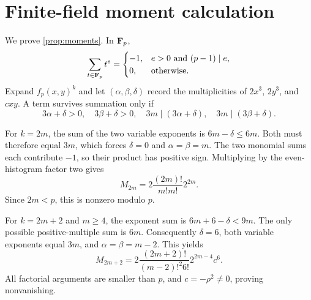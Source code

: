 \appendix
\section{Finite-field moment calculation}\label{sec:proofs}

We prove \cref{prop:moments}.  In $\mathbf F_p$,
\[
 \sum_{t\in\mathbf F_p}t^e=
 \begin{cases}
 -1,&e>0\text{ and }(p-1)\mid e,\\
 0,&\text{otherwise}.
 \end{cases}
\]
Expand $f_p(x,y)^k$ and let $(\alpha,\beta,\delta)$ record the
multiplicities of $2x^3$, $2y^3$, and $cxy$.  A term survives summation only
if
\[
 3\alpha+\delta>0,\quad3\beta+\delta>0,
 \quad
 3m\mid(3\alpha+\delta),\quad
 3m\mid(3\beta+\delta).
\]

For $k=2m$, the sum of the two variable exponents is
$6m-\delta\le6m$.  Both must therefore equal $3m$, which forces
$\delta=0$ and $\alpha=\beta=m$.  The two monomial sums each contribute
$-1$, so their product has positive sign.  Multiplying by the even-histogram
factor two gives
\[
 M_{2m}=2\frac{(2m)!}{m!m!}2^{2m}.
\]
Since $2m<p$, this is nonzero modulo $p$.

For $k=2m+2$ and $m\ge4$, the exponent sum is
$6m+6-\delta<9m$.  The only possible positive-multiple sum is $6m$.
Consequently $\delta=6$, both variable exponents equal $3m$, and
$\alpha=\beta=m-2$.  This yields
\[
 M_{2m+2}
 =2\frac{(2m+2)!}{(m-2)!^2 6!}2^{2m-4}c^6.
\]
All factorial arguments are smaller than $p$, and $c=-\rho^2\ne0$, proving
nonvanishing.

